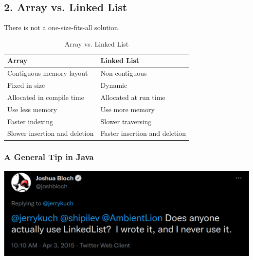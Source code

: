 \documentclass[aspectratio=169, 14pt]{beamer}
\begin{document}
\begin{frame}
    \section{\textcolor{darkmidnightblue}{2. Array vs. Linked List}}
    There is not a one-size-fits-all solution.

\end{frame}

\begin{frame}
    \begin{table}
        \caption*{Array vs. Linked List}
        \begin{tabular}{ll}
          \toprule
          Array & Linked List \\
          \midrule
          Contiguous memory layout & Non-contiguous \\
          Fixed in size & Dynamic \\
          Allocated in compile time & Allocated at run time \\
          Use less memory & Use more memory \\
          Faster indexing  & Slower traversing \\
          Slower insertion and deletion & Faster insertion and deletion \\
          \bottomrule
        \end{tabular}
    \end{table} 
\end{frame}

\begin{frame}
    \frametitle{A General Tip in Java}


    \pause
    \includegraphics[width=.85\textwidth]{week6/linked}

\end{frame}
\end{document}

